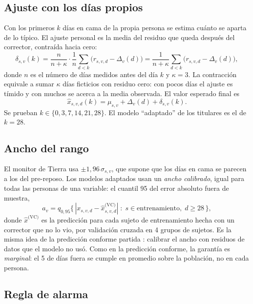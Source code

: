 \subsection{Ajuste con los días propios}

Con los primeros $k$ días en cama de la propia persona se estima cuánto se aparta de lo típico. El ajuste personal es
la media del residuo que queda después del corrector, contraída hacia cero:
\begin{equation}\label{eq:personal}
\delta_{s,v}(k) = \frac{n}{n + \kappa}\cdot\frac{1}{n}\sum_{d<k}\bigl(r_{s,v,d} - \Delta_v(d)\bigr)
               = \frac{1}{n+\kappa}\sum_{d<k}\bigl(r_{s,v,d} - \Delta_v(d)\bigr),
\end{equation}
donde $n$ es el número de días medidos antes del día $k$ y $\kappa = 3$. La contracción equivale a sumar $\kappa$ días
ficticios con residuo cero: con pocos días el ajuste es tímido y con muchos se acerca a la media observada. El valor
esperado final es
\begin{equation}\label{eq:esperado}
\hat x_{s,v,d}(k) = \mu_{s,v} + \Delta_v(d) + \delta_{s,v}(k).
\end{equation}
Se prueban $k \in \{0, 3, 7, 14, 21, 28\}$. El modelo \enquote{adaptado} de los titulares es el de $k = 28$.

\subsection{Ancho del rango}

El monitor de Tierra usa $\pm1{,}96\,\sigma_{s,v}$, que supone que los días en cama se parecen a los del pre-reposo.
Los modelos adaptados usan un \emph{ancho calibrado}, igual para todas las personas de una variable: el cuantil 95 del
error absoluto fuera de muestra,
\begin{equation}\label{eq:ancho}
a_v = q_{0{,}95}\bigl\{\,|x_{s,v,d} - \hat x^{\text{(VC)}}_{s,v,d}|\; : \; s \in \text{entrenamiento},\; d \ge 28 \,\bigr\},
\end{equation}
donde $\hat x^{\text{(VC)}}$ es la predicción para cada sujeto de entrenamiento hecha con un corrector que no lo vio,
por validación cruzada en 4 grupos de sujetos. Es la misma idea de la predicción conforme partida
\parencite{vovk2005,lei2018}: calibrar el ancho con residuos de datos que el modelo no usó. Como en la predicción
conforme, la garantía es \emph{marginal}: el 5\pct{} de días fuera se cumple en promedio sobre la población, no en
cada persona.

\subsection{Regla de alarma}

